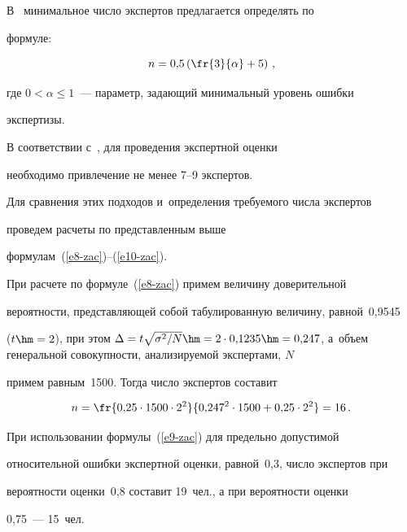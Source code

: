   

  В~\cite{11-zac} минимальное число экспертов предлагается определять по 

формуле:

  \begin{equation}

  n=0{,}5 \left( \fr{3}{\alpha}+5\right)\,,

  \label{e10-zac}

  \end{equation}

где $0<\alpha \leq 1$~--- параметр, задающий минимальный уровень ошибки 

экспертизы.

  

  В соответствии с~\cite{12-zac}, для проведения экспертной оценки 

необходимо привлечение не менее 7--9 экспертов.

  

  Для сравнения этих подходов и~определения требуемого числа экспертов 

проведем расчеты по представленным выше  

формулам~(\ref{e8-zac})--(\ref{e10-zac}).

  

  При расчете по формуле~(\ref{e8-zac}) примем величину доверительной 

вероятности, представляющей собой табулированную величину, равной~0,9545 

($t\hm=2$), при этом $\Delta= t \sqrt{\sigma^2/N}\hm= 2 \cdot 0{,}1235 \hm= 

0{,}247$, а~объем генеральной совокупности, анализируемой экспертами, $N$ 

примем равным~1500. Тогда число экспертов составит

  $$

  n= \fr{0{,}25 \cdot 1500\cdot 2^2}{0{,}247^2\cdot 1500 +0{,}25\cdot 

2^2}=16\,.

  $$

  

  При использовании формулы~(\ref{e9-zac}) для предельно допустимой 

относительной ошибки экспертной оценки, равной~0,3, число экспертов при 

вероятности оценки~0,8 составит 19~чел., а при вероятности оценки  

0,75~--- 15~чел. 

  

